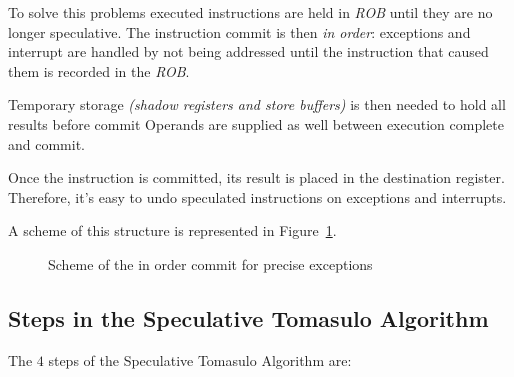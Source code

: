 \documentclass[english]{article}
\begin{document}
To solve this problems executed instructions are held in \textit{ROB} until they are no longer speculative.
The instruction commit is then \textit{in order}: exceptions and interrupt are handled by not being addressed until the instruction that caused them is recorded in the \textit{ROB}.

Temporary storage \textit{(shadow registers and store buffers)} is then needed to hold all results before commit
Operands are supplied as well between execution complete and commit.

Once the instruction is committed, its result is placed in the destination register.
Therefore, it's easy to undo speculated instructions on exceptions and interrupts.

A scheme of this structure is represented in Figure~\ref{fig:exceptions-in-order-commit}.

\begin{figure}[htbp]
  \bigskip
  \centering
  \caption{Scheme of the in order commit for precise exceptions}
  \label{fig:exceptions-in-order-commit}
  \bigskip
\end{figure}

\subsection{Steps in the Speculative Tomasulo Algorithm}

The \(4\) steps of the Speculative Tomasulo Algorithm are:
\end{document}
